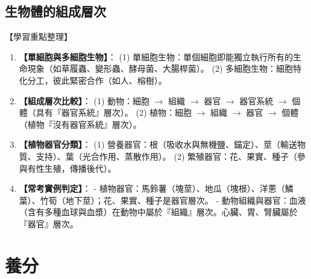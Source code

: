 \documentclass[11pt,a4paper]{article}
\begin{document}
\subsection{生物體的組成層次}
\begin{learningpoints}{【學習重點整理】}
\begin{enumerate}[label=\arabic*.]
  \item \textbf{【單細胞與多細胞生物】}：
  (1) 單細胞生物：單個細胞即能獨立執行所有的生命現象（如草履蟲、變形蟲、酵母菌、大腸桿菌）。
  (2) 多細胞生物：細胞特化分工，彼此緊密合作（如人、榕樹）。
  \item \textbf{【組成層次比較】}：
  (1) 動物：細胞 $\rightarrow$ 組織 $\rightarrow$ 器官 $\rightarrow$ 器官系統 $\rightarrow$ 個體（具有『器官系統』層次）。
  (2) 植物：細胞 $\rightarrow$ 組織 $\rightarrow$ 器官 $\rightarrow$ 個體（植物『沒有器官系統』層次）。
  \item \textbf{【植物器官分類】}：
  (1) 營養器官：根（吸收水與無機鹽、錨定）、莖（輸送物質、支持）、葉（光合作用、蒸散作用）。
  (2) 繁殖器官：花、果實、種子（參與有性生殖，傳播後代）。
  \item \textbf{【常考實例判定】}：
  - 植物器官：馬鈴薯（塊莖）、地瓜（塊根）、洋蔥（鱗葉）、竹筍（地下莖）；花、果實、種子是器官層次。
  - 動物組織與器官：血液（含有多種血球與血漿）在動物中屬於『組織』層次。心臟、胃、腎臟屬於『器官』層次。
\end{enumerate}
\end{learningpoints}

\newpage
\section{養分}
\end{document}
